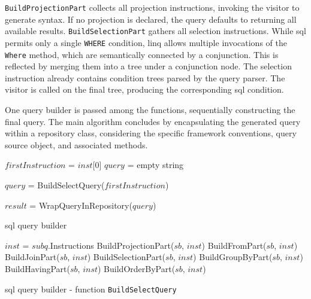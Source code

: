 \texttt{BuildProjectionPart} collects all projection instructions, invoking the visitor to generate syntax. If no projection is declared, the query defaults to returning all available results. \texttt{BuildSelectionPart} gathers all selection instructions. While \acrshort{sql} permits only a single \texttt{WHERE} condition, \acrshort{linq} allows multiple invocations of the \texttt{Where} method, which are semantically connected by a conjunction. This is reflected by merging them into a tree under a conjunction node. The selection instruction already contains condition trees parsed by the query parser. The visitor is called on the final tree, producing the corresponding \acrshort{sql} condition.

One query builder is passed among the functions, sequentially constructing the final query. The main algorithm concludes by encapsulating the generated query within a repository class, considering the specific framework conventions, query source object, and associated methods.

\begin{algorithm}[!htp]
    \footnotesize
    \DontPrintSemicolon

    

    $firstInstruction$ = $inst$[0]\;
    $query$ = empty string\;

     {
        $query$ = BuildSelectQuery($firstInstruction$)\;
    }

    $result$ = WrapQueryInRepository($query$)\;

    \caption{\acrshort{sql}  query builder}
    \label{alg:query_builder_main}
\end{algorithm}

\begin{algorithm}[!htp]
    \footnotesize
    \DontPrintSemicolon

    

    $inst$ = $subq$.Instructions\;
    \BlankLine
    BuildProjectionPart($sb$, $inst$)\;
    BuildFromPart($sb$, $inst$)\;
    BuildJoinPart($sb$, $inst$)\;
    BuildSelectionPart($sb$, $inst$)\;
    BuildGroupByPart($sb$, $inst$)\;
    BuildHavingPart($sb$, $inst$)\;
    BuildOrderByPart($sb$, $inst$)\;
    \BlankLine
    \caption{\acrshort{sql}  query builder - function \texttt{BuildSelectQuery}}
    \label{alg:query_builder_buildselect}
\end{algorithm}

